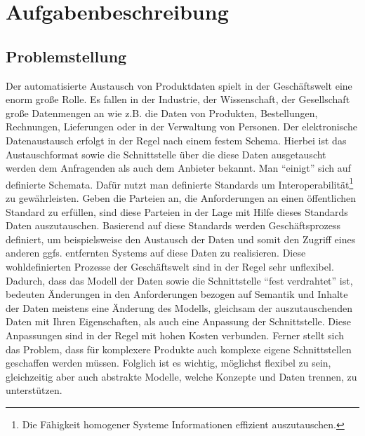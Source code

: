 \chapter{Aufgabenbeschreibung} \label{kap:aufgabenbeschreibung}

\section{Problemstellung}\label{sec:problemstellung}


Der automatisierte Austausch von Produktdaten spielt in der Geschäftswelt eine enorm große Rolle. Es fallen in der Industrie, der Wissenschaft, der Gesellschaft große Datenmengen an wie z.B. die Daten von Produkten, Bestellungen, Rechnungen, Lieferungen oder in der Verwaltung von Personen. Der elektronische Datenaustausch erfolgt in der Regel nach einem festem Schema. Hierbei ist das Austauschformat sowie die Schnittstelle über die diese Daten ausgetauscht werden dem Anfragenden als auch dem Anbieter bekannt. Man \enquote{einigt} sich auf definierte Schemata. Dafür nutzt man definierte Standards um Interoperabilität\footnote{Die Fähigkeit homogener Systeme Informationen effizient auszutauschen.} zu gewährleisten. Geben die Parteien an, die Anforderungen an einen öffentlichen Standard zu erfüllen, sind diese Parteien in der Lage mit Hilfe dieses Standards Daten auszutauschen. Basierend auf diese Standards werden Geschäftsprozess definiert, um beispielsweise den Austausch der Daten und somit den Zugriff eines anderen ggfs. entfernten Systems auf diese Daten zu realisieren. Diese wohldefinierten Prozesse  der Geschäftswelt sind in der Regel sehr unflexibel. Dadurch, dass das Modell der Daten sowie die Schnittstelle \enquote{fest verdrahtet} ist, bedeuten Änderungen in den Anforderungen bezogen auf Semantik und Inhalte der Daten meistens eine Änderung des Modells, gleichsam der auszutauschenden Daten mit Ihren Eigenschaften, als auch eine Anpassung der Schnittstelle. Diese Anpassungen sind in der Regel mit hohen Kosten verbunden. 
Ferner stellt sich das Problem, dass für komplexere Produkte auch komplexe eigene Schnittstellen geschaffen werden müssen. 
Folglich ist es wichtig, möglichst flexibel zu sein, gleichzeitig aber auch abstrakte Modelle, welche Konzepte und Daten trennen, zu unterstützen. 


